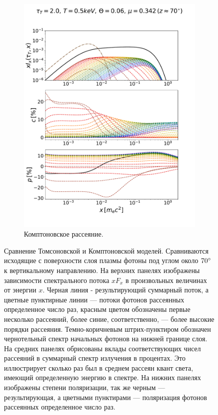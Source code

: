 \documentclass[14pt,a4paper]{extarticle}
\begin{document}
\begin{figure}[H]
\begin{subfigure}{.5\textwidth}
					\includegraphics[width=\textwidth]{CM9z70.pdf}
					\caption{\small\centering Комптоновское рассеяние.}
					\end{subfigure}
				\caption{\small
					Сравнение Томсоновской и Комптоновской моделей. 
					Сравниваются исходящие с поверхности слоя плазмы фотоны под углом около $70\degree$ к вертикальному направлению.
					На верхних панелях изображены зависимости спектрального потока $xF_x$ в произвольных величинах от энергии $x$. 
					Черная линия - результирующий суммарный поток, а цветные пунктирные линии --- потоки фотонов рассеянных определенное число раз, красным цветом обозначены первые несколько рассеяний, более синие, соответственно, --- более высокие порядки рассеяния. 
					Темно-коричневым штрих-пунктиром обозначен чернотельный спектр начальных фотонов на нижней границе слоя. 
					На средних панелях обрисованы вклады соответствующих чисел рассеяний в суммарный спектр излучения в процентах. Это иллюстрирует сколько раз был в среднем рассеян квант света, имеющий определенную энергию в спектре. 
					На нижних панелях изображены степени поляризации, так же черным --- результирующая, а цветными пунктирами --- поляризация фотонов рассеянных определенное число раз.  
					}\label{fig:specificanglecomperison}
			\end{figure}\newpage
\end{document}
